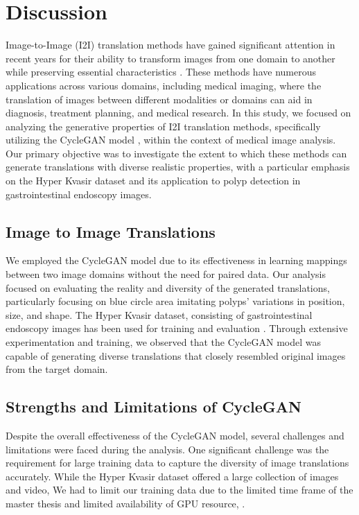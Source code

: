 \documentclass[UKenglish,12pt]{master-style}
\begin{document}
\chapter{Discussion}

Image-to-Image (I2I) translation methods have gained significant attention in recent years for their ability to transform images from one domain to another while preserving essential characteristics \cite{I2I} . These methods have numerous applications across various domains, including medical imaging, where the translation of images between different modalities or domains can aid in diagnosis, treatment planning, and medical research. In this study, we focused on analyzing the generative properties of I2I translation methods, specifically utilizing the CycleGAN model \cite{CycleGAN} , within the context of medical image analysis. Our primary objective was to investigate the extent to which these methods can generate translations with diverse realistic properties, with a particular emphasis on the Hyper Kvasir dataset and its application to polyp detection in gastrointestinal endoscopy images.

\section{Image to Image Translations}
We employed the CycleGAN model due to its effectiveness in learning mappings between two image domains without the need for paired data. 
Our analysis focused on evaluating the reality and diversity of the generated translations, particularly focusing on blue circle area imitating polyps' variations in position, size, and shape. The Hyper Kvasir dataset, consisting of gastrointestinal endoscopy images has been used for training and evaluation \cite{HyperKvasir_Dataset} . Through extensive experimentation and training, we observed that the CycleGAN model was capable of generating diverse translations that closely resembled original images from the target domain. 

\section{Strengths and Limitations of CycleGAN}
Despite the overall effectiveness of the CycleGAN model, several challenges and limitations were faced during the analysis. One significant challenge was the requirement for large training data to capture the diversity of image translations accurately. While the Hyper Kvasir dataset offered a large collection of images and video, We had to limit our training data due to the limited time frame of the master thesis and limited availability of GPU resource, . 
\end{document}
